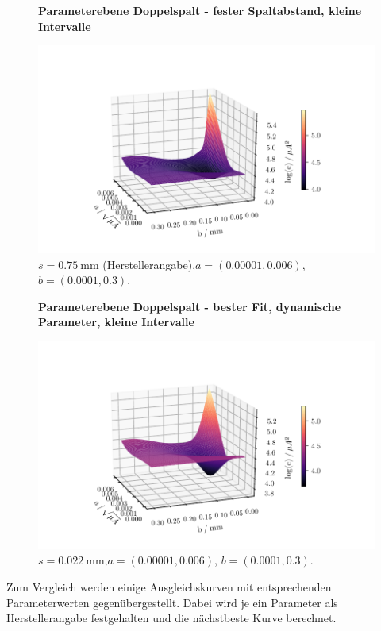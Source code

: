 \centering
\begin{figure}
    \centering
    \textbf{Parameterebene Doppelspalt - fester Spaltabstand, kleine Intervalle}\par\medskip
    \includegraphics[width=.9\textwidth]{python/leastSquaresDoppel3ss.pdf}
    \caption{$s = \SI{0.75}{\milli\meter}$ (Herstellerangabe),$a = (0.00001, 0.006)$, $b = (0.0001, 0.3)$.}
    \label{fig:lsd3ss}
\end{figure}
\begin{figure}
    \centering
    \textbf{Parameterebene Doppelspalt - bester Fit, dynamische Parameter, kleine Intervalle}\par\medskip
    \includegraphics[width=.9\textwidth]{python/leastSquaresDoppel3s.pdf}
    \caption{$s = \SI{0.022}{\milli\meter}$,$a = (0.00001, 0.006)$, $b = (0.0001, 0.3)$.}
    \label{fig:lsd3s}
\end{figure}

Zum Vergleich werden einige Ausgleichskurven mit entsprechenden Parameterwerten gegenübergestellt. Dabei wird je ein Parameter als Herstellerangabe
festgehalten und die nächstbeste Kurve berechnet.

